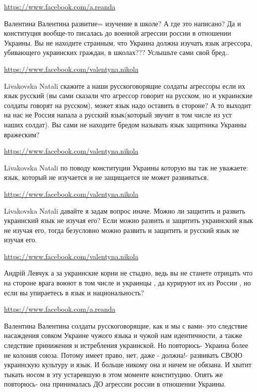 \documentclass[a4paper,11pt]{extreport}
\begin{document}
\begin{itemize}
\begin{itemize}
\url{https://www.facebook.com/a.reanda}

Валентина Валентина развитие= изучение в школе? А где это написано?
Да и конституция вообще-то писалась до военной агрессии россии в отношении Украины.
Вы не находите странным, что Украина должна изучать язык агрессора, убивающего украинских граждан, в школах???
Услышьте сами свой бред..

\url{https://www.facebook.com/valentyna.nikola}

Livakovska Natali скажите а наши русскоговорящие солдаты агрессоры если их язык русский (вы сами сказали что агрессор говорит на русском, но и украинские солдаты говорят на русском), может язык надо оставить в стороне? А то выходит на нас не Россия напала а русский язык(который звучит в том числе из уст наших солдат). Вы сами не находите бредом называть язык защитника Украины вражеским?

\url{https://www.facebook.com/valentyna.nikola}

Livakovska Natali по поводу конституции Украины которую вы так не уважаете: язык, который не изучается и не защищается не может развиваться.

\url{https://www.facebook.com/valentyna.nikola}

Livakovska Natali давайте я задам вопрос иначе.
Можно ли защитить и развить украинский язык не изучая его?
Если можно развить и защитить украинский язык не изучая его, тогда безусловно можно развить и защитить и русский язык не изучая его.

\url{https://www.facebook.com/valentyna.nikola}

Андрій Левчук а за украинские корни не стыдно, ведь вы не станете отрицать что на стороне врага воюют в том числе и украинцы , да курируют их из России , но если вы упираетесь в язык и национальность?

\url{https://www.facebook.com/a.reanda}

Валентина Валентина солдаты русскоговорящие, как и мы с вами- это следствие насаждения совком Украине чужого языка и чужой нам идентичности, а также следствие принижения и истребления украинской.
Но повторюсь- Украина более не колония союза. Потому имеет право, нет, даже - должна!- развивать СВОЮ украинскую культуру и язык.
И больше никому она и ничем не обязана.
И хватит тыкать носом в эту устаревшую в этом моменте конституцию. Опять же повторюсь- она принималась ДО агрессии россии в отношении Украины.


\end{itemize}
\end{itemize}
\end{document}
